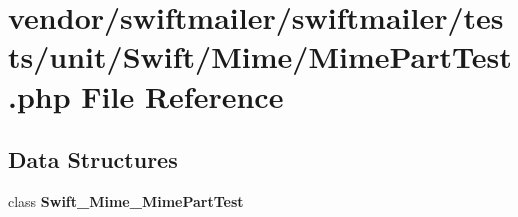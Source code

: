 \section{vendor/swiftmailer/swiftmailer/tests/unit/\+Swift/\+Mime/\+Mime\+Part\+Test.php File Reference}
\label{_mime_part_test_8php}
\subsection*{Data Structures}
\begin{DoxyCompactItemize}
\item 
class {\bf Swift\+\_\+\+Mime\+\_\+\+Mime\+Part\+Test}
\end{DoxyCompactItemize}
